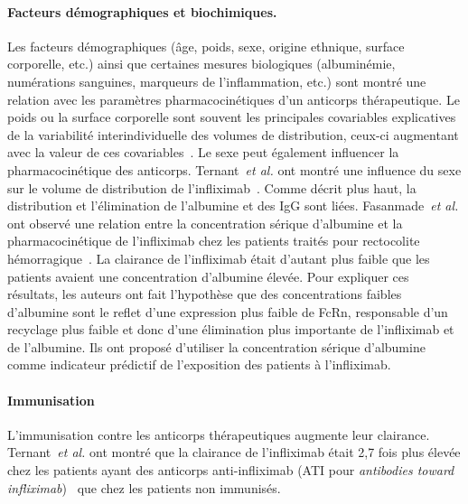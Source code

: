 \paragraph{Facteurs démographiques et biochimiques.} Les facteurs démographiques (âge, poids, sexe, origine ethnique, surface corporelle, etc.) ainsi que certaines mesures biologiques (albuminémie, numérations sanguines, marqueurs de l'inflammation, etc.) sont montré une relation avec les paramètres pharmacocinétiques d'un anticorps thérapeutique. Le poids ou la surface corporelle sont souvent les principales covariables explicatives de la variabilité interindividuelle des volumes de distribution, ceux-ci augmentant avec la valeur de ces covariables~\citep{REF52, REF61, REF74, REF76, REF78, REF79, REF80}. Le sexe peut également influencer la pharmacocinétique des anticorps. Ternant~\textit{et al.} ont montré une influence du sexe sur le volume de distribution de l'infliximab~\citep{REF71}. 
Comme décrit plus haut, la distribution et l'élimination de l'albumine et des IgG sont liées. Fasanmade~\textit{et al.} ont observé une relation entre la concentration sérique d'albumine et la pharmacocinétique de l'infliximab chez les patients traités pour rectocolite hémorragique~\citep{REF81}. La clairance de l'infliximab était d'autant plus faible que les patients avaient une concentration d'albumine élevée. Pour expliquer ces résultats, les auteurs ont fait l'hypothèse que des concentrations faibles d'albumine sont le reflet d'une expression plus faible de FcRn, responsable d'un recyclage plus faible et donc d'une élimination plus importante de l'infliximab et de l'albumine. Ils ont proposé d'utiliser la concentration sérique d'albumine comme indicateur prédictif de l'exposition des patients à l'infliximab.
\paragraph{Immunisation}
L'immunisation contre les anticorps thérapeutiques augmente leur clairance. Ternant~\textit{et al.} ont montré que la clairance de l'infliximab était 2,7 fois plus élevée chez les patients ayant des anticorps anti-infliximab (\gls{ATI} pour \textit{antibodies toward infliximab})~\citep{REF71} que chez les patients non immunisés.

